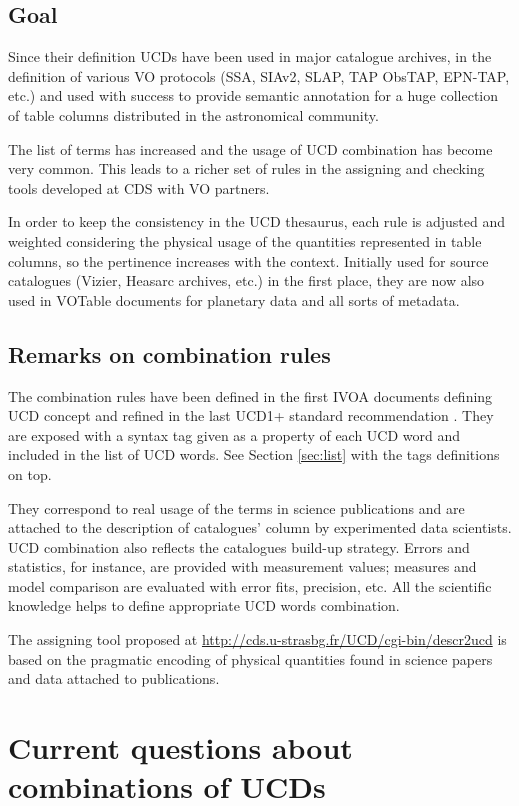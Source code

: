 \documentclass[11pt,a4paper]{ivoa}
\begin{document}
\subsection{Goal}
Since their definition UCDs have been used in major catalogue archives, in the definition of various
VO protocols (SSA, SIAv2, SLAP, TAP ObsTAP, EPN-TAP, etc.) and used with success to provide semantic
annotation for a huge collection of table columns distributed in the astronomical community.

The list of terms has increased and the usage of UCD combination has become very common. This leads
to a richer set of rules in the assigning and checking tools developed at CDS with VO partners.

In order to keep the consistency in the UCD thesaurus, each rule is adjusted and weighted considering 
the physical usage of the quantities represented in table columns, so the pertinence increases with 
the context. Initially used for source catalogues (Vizier, Heasarc archives, etc.) in the first place, 
they are now also used in VOTable documents for planetary data \citep{wd:epntap,erard-vespa} and all sorts of metadata.

\subsection{Remarks on combination rules}
The combination rules have been defined in the first IVOA documents defining UCD concept
\citep{2005ivoa.spec.0819D} and refined in the last UCD1+ standard recommendation \citep{2018ivoa.spec.0527PM}. 
They are exposed with a syntax tag given as a property of each UCD word 
and included in the list of UCD words. See Section \ref{sec:list} with the tags definitions on top.

They correspond to real usage of the terms in science publications and are attached to the description 
of catalogues’ column by experimented data scientists. UCD combination also reflects the catalogues 
build-up strategy. Errors and statistics, for instance, are provided with measurement values; measures 
and model comparison are evaluated with error fits, precision, etc. All the scientific knowledge helps 
to define appropriate UCD words combination.

The assigning tool proposed at \url{http://cds.u-strasbg.fr/UCD/cgi-bin/descr2ucd} is based on the
pragmatic encoding of physical quantities found in science papers and data attached to publications.

\section{Current questions about combinations of UCDs}
\end{document}
